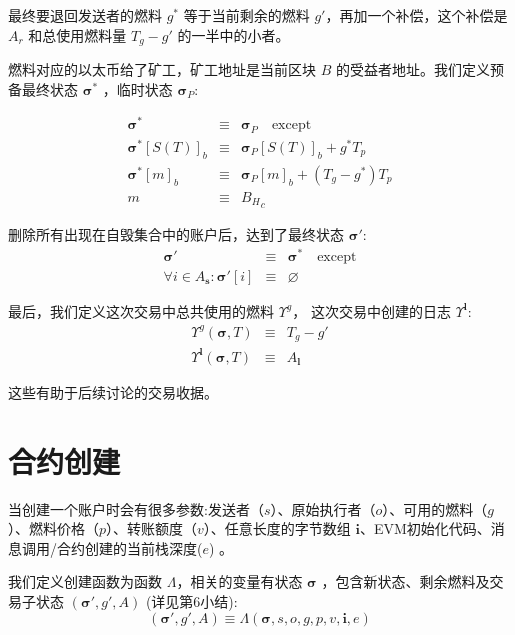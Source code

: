 \documentclass[9pt,oneside]{amsart}
\begin{document}
\begin{multicols}{2}
最终要退回发送者的燃料 $g^*$ 等于当前剩余的燃料 $g'$，再加一个补偿，这个补偿是 $A_r$ 和总使用燃料量 $T_g - g'$ 的一半中的小者。

燃料对应的以太币给了矿工，矿工地址是当前区块 $B$ 的受益者地址。我们定义预备最终状态 $\boldsymbol{\sigma}^*$ ，临时状态 $\boldsymbol{\sigma}_P$:

\begin{eqnarray}
\boldsymbol{\sigma}^* & \equiv & \boldsymbol{\sigma}_P \quad \text{except} \\
\boldsymbol{\sigma}^*[S(T)]_b & \equiv & \boldsymbol{\sigma}_P[S(T)]_b + g^* T_p \\
\boldsymbol{\sigma}^*[m]_b & \equiv & \boldsymbol{\sigma}_P[m]_b + (T_g - g^*) T_p \\
m & \equiv & {B_H}_c
\end{eqnarray}

删除所有出现在自毁集合中的账户后，达到了最终状态 $\boldsymbol{\sigma}'$:
\begin{eqnarray}
\boldsymbol{\sigma}' & \equiv & \boldsymbol{\sigma}^* \quad \text{except} \\
\forall i \in A_\mathbf{s}: \boldsymbol{\sigma}'[i] & \equiv & \varnothing
\end{eqnarray}

最后，我们定义这次交易中总共使用的燃料 $\Upsilon^g$， 这次交易中创建的日志 $\Upsilon^\mathbf{l}$:
\begin{eqnarray}
\Upsilon^g(\boldsymbol{\sigma}, T) & \equiv & T_g - g' \\
\Upsilon^\mathbf{l}(\boldsymbol{\sigma}, T) & \equiv & A_\mathbf{l}
\end{eqnarray}

这些有助于后续讨论的交易收据。

\section{合约创建} \label{ch:create}

当创建一个账户时会有很多参数:发送者（$s$）、原始执行者（$o$）、可用的燃料（$g$）、燃料价格（$p$）、转账额度（$v$）、任意长度的字节数组 $\mathbf{i}$、EVM初始化代码、消息调用/合约创建的当前栈深度($e$) 。

我们定义创建函数为函数 $\Lambda$，相关的变量有状态 $\boldsymbol{\sigma}$ ，包含新状态、剩余燃料及交易子状态 $(\boldsymbol{\sigma}', g', A)$ (详见第6小结):
\begin{equation}
(\boldsymbol{\sigma}', g', A) \equiv \Lambda(\boldsymbol{\sigma}, s, o, g, p, v, \mathbf{i}, e)
\end{equation}


\end{multicols}
\end{document}
